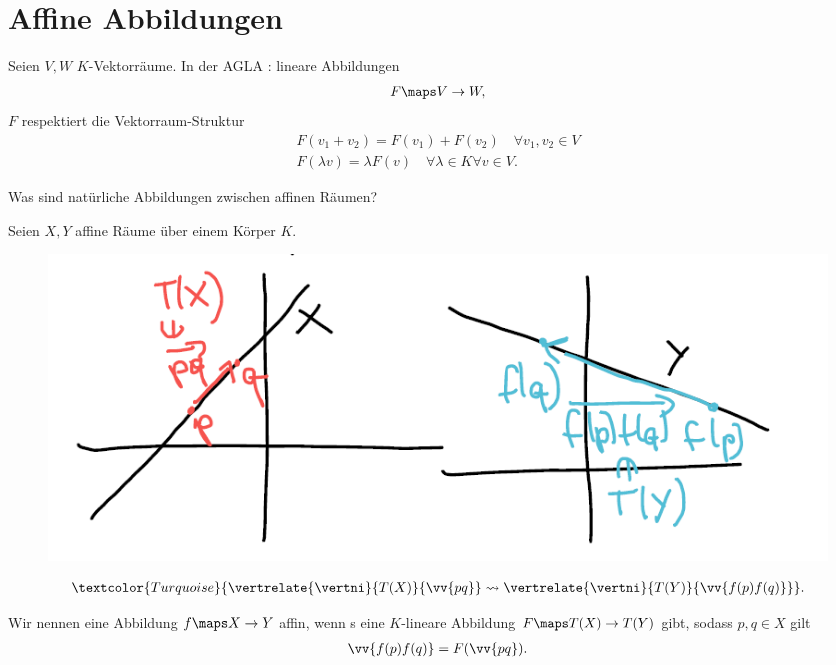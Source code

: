 \section{Affine Abbildungen}
Seien \( V,W \) \( K \)-Vektorräume.
In der AGLA : lineare Abbildungen
\begin{align*}
    F\maps V\to W,
\end{align*}
\dh \( F \) respektiert die Vektorraum-Struktur
\begin{align*}
    F(v_1+v_2)=F(v_1)+F(v_2)\quad\forall v_1,v_2\in V\\
    F(\lambda v)=\lambda F(v)\quad \forall\lambda\in K \forall v \in V.
\end{align*}
\begin{frage*}
    Was sind natürliche Abbildungen zwischen affinen Räumen?
\end{frage*}
Seien \( X, Y \) affine Räume über einem Körper \( K \).
\begin{figure}[H]
    \centering
    \includegraphics[width=0.8\linewidth]{figures/affine_Abbildungen}
    \label{fig:affine_Abbildungen}
\end{figure}
\begin{align*}
    \textcolor{Turquoise}{\vertrelate{\vertni}{T(X)}{\vv{pq}}\rightsquigarrow\vertrelate{\vertni}{T(Y)}{\vv{f(p)f(q)}}}.
\end{align*}
\begin{definition*}
    Wir nennen eine Abbildung \( f\maps X \to Y \) affin, wenn s eine \( K \)-lineare Abbildung \( F\maps T(X)\to T(Y) \) gibt, sodass \tforall \( p,q\in X \) gilt
    \begin{align*}
        \vv{f(p)f(q)}=F(\vv{pq}).
    \end{align*}
\end{definition*}
